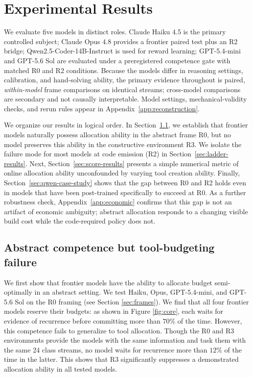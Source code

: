 \documentclass{article}
\begin{document}
\section{Experimental Results}
\label{sec:results}

We evaluate five models in distinct roles. Claude Haiku 4.5 is the primary controlled subject; Claude Opus 4.8 provides a frontier paired test plus an R2 bridge; Qwen2.5-Coder-14B-Instruct is used for reward learning; GPT-5.4-mini and GPT-5.6 Sol are evaluated under a preregistered competence gate with matched R0 and R2 conditions. Because the models differ in reasoning settings, calibration, and hand-solving ability, the primary evidence throughout is paired, \emph{within-model} frame comparisons on identical streams; cross-model comparisons are secondary and not causally interpretable. Model settings, mechanical-validity checks, and rerun rules appear in Appendix~\ref{app:reconstruction}.

We organize our results in logical order. In Section~\ref{sec:gate}, we establish that 
frontier models naturally possess allocation ability in the abstract frame R0, but no model preserves this ability in the 
constructive environment R3. We isolate the failure mode for most models at code 
emission (R2) in Section~\ref{sec:ladder-results}. Next, Section~\ref{sec:score-results}
presents a simple numerical metric of online allocation ability unconfounded by varying tool 
creation ability. Finally, Section~\ref{sec:qwen-case-study} shows that the gap between R0 and R2 holds
even in models that have been post-trained specifically to succeed at R0. As a further robustness check, Appendix~\ref{app:economic} confirms that this gap is not an artifact of economic ambiguity;  abstract allocation responds to a changing visible build cost while the code-required policy does not.

\subsection{Abstract competence but tool-budgeting failure}
\label{sec:gate}

We first show that frontier models have the ability to 
allocate budget semi-optimally in an abstract setting. We test Haiku, Opus, 
GPT-5.4-mini, and GPT-5.6 Sol on the R0 framing (see Section \ref{sec:frames}). We find that all four frontier models reserve their 
budgets: as shown in Figure \ref{fig:core}, each waits for evidence of recurrence before committing more than $70\%$ of the time. However, this competence fails to generalize to tool allocation. Though the
R0 and R3 environments provide the models with the same information and task them with the same 24 class streams, no model waits for recurrence more than $12\%$ of the time in the latter. This shows that R3 significantly suppresses a demonstrated allocation ability in all tested models.
\end{document}
